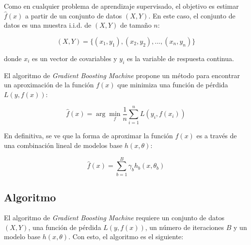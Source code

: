 Como en cualquier problema de aprendizaje supervisado, el objetivo es estimar $\hat{f}(x)$ a partir de un conjunto de datos $(X,Y)$. En este caso, el conjunto de datos es una muestra i.i.d. de $(X,Y)$ de tamaño $n$:

\begin{equation}
(X,Y)=\{(x_1,y_1),(x_2,y_2),...,(x_n,y_n)\}
\end{equation}

donde $x_i$ es un vector de covariables y $y_i$ es la variable de respuesta continua.

El algoritmo de \textit{Gradient Boosting Machine} propone un método para encontrar un aproximación de la función $f(x)$ que minimiza una función de pérdida $L(y,f(x))$:

\begin{equation}
\hat{f}(x)=\arg\min_{f}\frac{1}{n}\sum_{i=1}^{n}L(y_i,f(x_i))
\end{equation}

En definitiva, se ve que la forma de aproximar la función $f(x)$ es a través de una combinación lineal de modelos base $h(x,\theta)$:

\begin{equation}
\hat{f}(x)=\sum_{b=1}^{B}\gamma_b h_b(x,\theta_b)
\end{equation}

\subsection{Algoritmo}
El algoritmo de \textit{Gradient Boosting Machine} requiere un conjunto de datos $(X,Y)$, una función de pérdida $L(y,f(x))$, un número de iteraciones $B$ y un modelo base $h(x,\theta)$. Con esto, el algoritmo es el siguiente:

